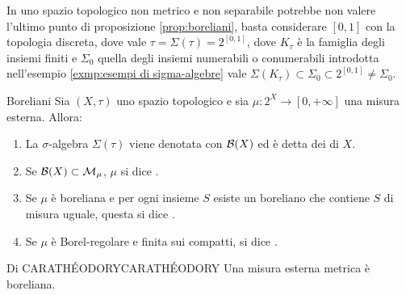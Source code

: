 \begin{remark}{}{}
    In uno spazio topologico non metrico e non separabile potrebbe non valere l'ultimo punto di proposizione \ref{prop:boreliani}, basta considerare $[0,1]$ con la topologia discreta, dove vale $\tau = \Sigma(\tau) = 2^{[0,1]}$, dove $K_\tau$ è la famiglia degli insiemi finiti e $\Sigma_0$ quella degli insiemi numerabili o conumerabili introdotta nell'esempio \ref{exmp:esempi di sigma-algebre} vale $\Sigma(K_\tau) \subset \Sigma_0 \subset 2^{[0,1]} \ne \Sigma_0$.
\end{remark}

\begin{definition}{Boreliani}{}
    Sia $(X,\tau)$ uno spazio topologico e sia $\mu : 2^X \to [0,+\infty]$ una misura esterna. Allora:\begin{enumerate}
        \item La $\sigma$-algebra $\Sigma(\tau)$ viene denotata con $\mathcal{B}(X)$ ed è detta dei  di $X$.
        \item Se $\mathcal{B}(X) \subset \mathcal{M}_\mu$, $\mu$ si dice .
        \item Se $\mu$ è boreliana e per ogni insieme $S$ esiste un boreliano che contiene $S$ di misura uguale, questa si dice .
        \item Se $\mu$ è Borel-regolare e finita sui compatti, si dice .
    \end{enumerate}
\end{definition}
\begin{corollary}{Di CARATHÉODORY}{CARATHÉODORY}
    Una misura esterna metrica è boreliana.
\end{corollary}

